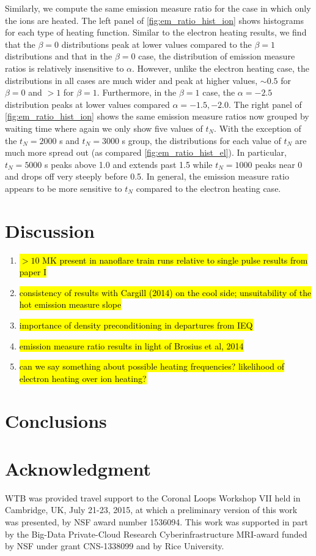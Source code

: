 \documentclass[apj]{emulateapj}
\begin{document}
	\par Similarly, we compute the same emission measure ratio for the case in which only the ions are heated. The left panel of \autoref{fig:em_ratio_hist_ion} shows histograms for each type of heating function. Similar to the electron heating results, we find that the $\beta=0$ distributions peak at lower values compared to the $\beta=1$ distributions and that in the $\beta=0$ case, the distribution of emission measure ratios is relatively insensitive to $\alpha$. However, unlike the electron heating case, the distributions in all cases are much wider and peak at higher values, $\sim0.5$ for $\beta=0$ and $>1$ for $\beta=1$. Furthermore, in the $\beta=1$ case, the $\alpha=-2.5$ distribution peaks at lower values compared $\alpha=-1.5,-2.0$. The right panel of \autoref{fig:em_ratio_hist_ion} shows the same emission measure ratios now grouped by waiting time where again we only show five values of $t_N$. With the exception of the $t_N=2000$ s and $t_N=3000$ s group, the distributions for each value of $t_N$ are much more spread out (as compared \autoref{fig:em_ratio_hist_el}). In particular, $t_N=5000$ s peaks above 1.0 and extends past 1.5 while $t_N=1000$ peaks near 0 and drops off very steeply before 0.5. In general, the emission measure ratio appears to be more sensitive to $t_N$ compared to the electron heating case.
	\section{Discussion}
	\label{sec:discussion}
	\begin{enumerate}
	\item \hl{$>10$ MK present in nanoflare train runs relative to single pulse results from paper I}
	\item \hl{consistency of results with Cargill (2014) on the cool side; unsuitability of the hot emission measure slope}
	\item \hl{importance of density preconditioning in departures from IEQ} 
	\item \hl{emission measure ratio results in light of Brosius et al, 2014}
	\item \hl{can we say something about possible heating frequencies? likelihood of electron heating over ion heating?}
	\end{enumerate}
	\section{Conclusions}
	\label{sec:conclusions}
	\section*{Acknowledgment}
	WTB was provided travel support to the Coronal Loops Workshop VII held in Cambridge, UK, July 21-23, 2015, at which a preliminary version of this work was presented, by NSF award number 1536094. This work was supported in part by the Big-Data Private-Cloud Research Cyberinfrastructure MRI-award funded by NSF under grant CNS-1338099 and by Rice University.
	
	
	\clearpage
\end{document}

